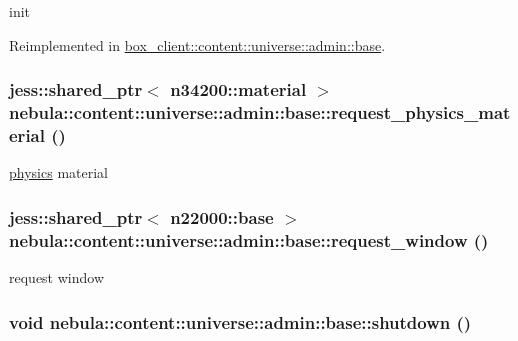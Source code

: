 init 

Reimplemented in \hyperlink{classbox__client_1_1content_1_1universe_1_1admin_1_1base_a9a49454fde89dacb9318efaa72532505}{box\_\-client::content::universe::admin::base}.\hypertarget{classnebula_1_1content_1_1universe_1_1admin_1_1base_a65152a782100c9b33ed4a60ddc5373d4}{
\subsubsection[{request\_\-physics\_\-material}]{\setlength{\rightskip}{0pt plus 5cm}jess::shared\_\-ptr$<$ {\bf n34200::material} $>$ nebula::content::universe::admin::base::request\_\-physics\_\-material ()}}
\label{classnebula_1_1content_1_1universe_1_1admin_1_1base_a65152a782100c9b33ed4a60ddc5373d4}


\hyperlink{namespacenebula_1_1content_1_1physics}{physics} material \hypertarget{classnebula_1_1content_1_1universe_1_1admin_1_1base_af02d79b18b21c674517ab21ad9ab7e97}{
\subsubsection[{request\_\-window}]{\setlength{\rightskip}{0pt plus 5cm}jess::shared\_\-ptr$<$ {\bf n22000::base} $>$ nebula::content::universe::admin::base::request\_\-window ()}}
\label{classnebula_1_1content_1_1universe_1_1admin_1_1base_af02d79b18b21c674517ab21ad9ab7e97}


request window \hypertarget{classnebula_1_1content_1_1universe_1_1admin_1_1base_ad7a45a5bd4f97fb70f65fcb400454eee}{
\subsubsection[{shutdown}]{\setlength{\rightskip}{0pt plus 5cm}void nebula::content::universe::admin::base::shutdown ()}}
\label{classnebula_1_1content_1_1universe_1_1admin_1_1base_ad7a45a5bd4f97fb70f65fcb400454eee}



